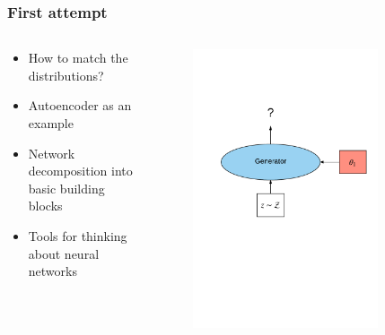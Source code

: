 \documentclass{Bredelebeamer}
\begin{document}
\begin{frame}
\frametitle{First attempt}
\begin{columns}
\begin{column}{0.5\textwidth}
	\begin{itemize}[<+->]
		\item How to match the distributions?
		\item Autoencoder as an example
		\item Network decomposition into basic building blocks
		\item Tools for thinking about neural networks
	\end{itemize}
\end{column}
\begin{column}{0.5\textwidth}  
	\begin{figure}[h!]
		\centering
		\includegraphics[width=0.8\textwidth]{first_attempt_gan.png}
	\end{figure}
\end{column}
\end{columns}


\end{frame}
\end{document}
